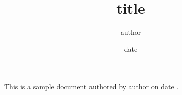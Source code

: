 \documentclass{article}
\title{ {{ title }} }
\author{ {{ author }} }
\date{ {{ date }} }
\begin{document}
\maketitle

This is a sample document authored by {{ author }} on {{ date }}.
\end{document}
